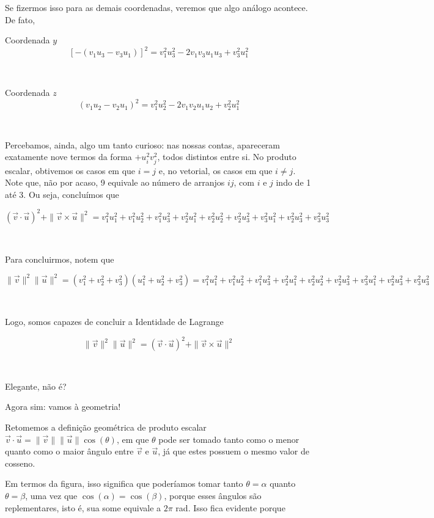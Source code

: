 Se fizermos isso para as demais coordenadas, veremos que algo análogo acontece. De fato,

Coordenada \(y\)
\[
[-(v_1u_3 - v_3u_1)]^2 = v_1^2u_3^2 - 2v_1v_3u_1u_3 + v_3^2u_1^2
\]

 

Coordenada \(z\)
\[
(v_1u_2 - v_2u_1)^2 = v_1^2u_2^2 - 2v_1v_2u_1u_2 + v_2^2u_1^2
\]

 

Percebamos, ainda, algo um tanto curioso: nas nossas contas, apareceram exatamente nove termos da forma \(+ u_i^2v_j^2\), todos distintos entre si. No produto escalar, obtivemos os casos em que \(i = j\) e, no vetorial, os casos em que \(i \neq j\). Note que, não por acaso, 9 equivale ao número de arranjos \(ij\), com \(i\) e \(j\) indo de 1 até 3. Ou seja, concluímos que

\[
(\vec{v} \cdot \vec{u})^2 + \|\vec{v} \times \vec{u}\|^2 = v_1^2u_1^2 + v_1^2u_2^2 + v_1^2u_3^2 + v_2^2u_1^2 + v_2^2u_2^2 + v_2^2u_3^2 + v_3^2u_1^2 + v_2^2u_3^2 + v_3^2u_3^2
\]


 

Para concluirmos, notem que

\[
\|\vec{v}\|^2\|\vec{u}\|^2 = (v_1^2 + v_2^2 + v_3^2)(u_1^2 + u_2^2 + v_3^2) = v_1^2u_1^2 + v_1^2u_2^2 + v_1^2u_3^2 + v_2^2u_1^2 + v_2^2u_2^2 + v_2^2u_3^2 + v_3^2u_1^2 + v_2^2u_3^2 + v_3^2u_3^2
\]

 

Logo, somos capazes de concluir a Identidade de Lagrange




\[
\|\vec{v}\|^2\|\vec{u}\|^2 = (\vec{v} \cdot \vec{u})^2 + \|\vec{v} \times \vec{u}\|^2
\]

 

Elegante, não é?

Agora sim: vamos à geometria!




Retomemos a definição geométrica de produto escalar \(\vec{v} \cdot \vec{u} = \|\vec{v}\|\|\vec{u}\|\cos(\theta)\), em que \(\theta\) pode ser tomado tanto como o menor quanto como o maior ângulo entre \(\vec{v}\) e \(\vec{u}\), já que estes possuem o mesmo valor de cosseno.




Em termos da figura, isso significa que poderíamos tomar tanto \(\theta = \alpha\) quanto \(\theta = \beta\), uma vez que \(\cos(\alpha) = \cos(\beta)\), porque esses ângulos são replementares, isto é, sua some equivale a \(2\pi \) rad. Isso fica evidente porque

